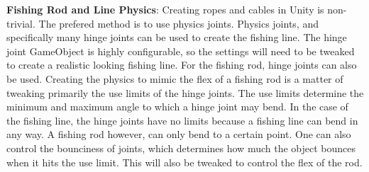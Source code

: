 \documentclass[10pt,journal,compsoc,onecolumn, draftclsnofoot]{IEEEtran}
\begin{document}
\hangindent=0.5cm \textbf{Fishing Rod and Line Physics}: Creating ropes and cables in Unity is non-trivial.
The prefered method is to use physics joints.
Physics joints, and specifically many hinge joints can be used to create the fishing line.
The hinge joint GameObject is highly configurable, so the settings will need to be tweaked to create a realistic looking fishing line.
For the fishing rod, hinge joints can also be used.
Creating the physics to mimic the flex of a fishing rod is a matter of tweaking primarily the use limits of the hinge joints.
The use limits determine the minimum and maximum angle to which a hinge joint may bend.\cite{unity_physics_joints}
In the case of the fishing line, the hinge joints have no limits because a fishing line can bend in any way.
A fishing rod however, can only bend to a certain point.
One can also control the bounciness of joints, which determines how much the object bounces when it hits the use limit.
This will also be tweaked to control the flex of the rod.



\end{document}
